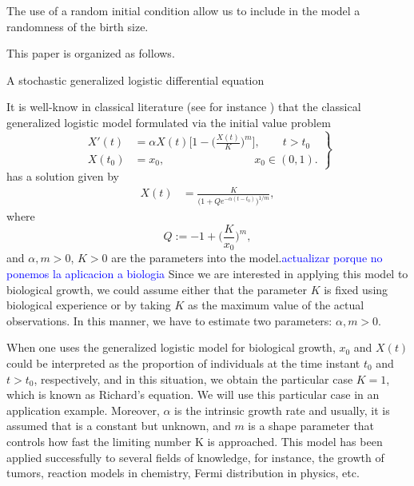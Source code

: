 \documentclass[12pt, reqno]{amsart}
\makeatletter
\def\section{\@startsection{section}{1}%
     \z@{.7\linespacing\@plus\linespacing}{.5\linespacing}%
     {\bfseries
     \centering
     }}
\newcommand{\fer}[1]{{\textcolor{blue}{#1}}}
\newcommand{\1}{{\bf 1}}
\newcommand{\2}{{\bf 2}}
\theoremstyle{definition}
\theoremstyle{remark}
\numberwithin{equation}{section}
\makeatother
\begin{document}
	The use of a random initial condition  allow us to include in the model a 
randomness of the  birth size.

This paper is organized as follows.

\section{A stochastic generalized logistic differential equation}
	\label{sec-SGLDE}

	It is well-know in classical literature (see for instance \cite{br-go}) that the classical generalized logistic model formulated via the initial value problem 
\begin{equation}\label{det-GLDE}
  \left.
  \begin{aligned} 
  	X'(t) &= 
  		\alpha X(t)
  			\Bigg[
  				1 - 
  				\Bigg(
  					\frac{X(t)}{K}
  					\Bigg )^m\Bigg],\qquad t>t_0
  	\\
 		X(t_0) &= 
 			x_0,
 			\qquad\qquad\qquad \qquad
 			x_0\in(0,1).
 \end{aligned}
 \right\}
 \end{equation}
has a solution given by 
\begin{align}
 X(t)&= \frac{K}{\Big(1+ Q  e^{-\alpha(t-t_0)}\Big)^{1/m}},
\end{align}
where
$$
Q:= -1 + \Big(\frac{K}{x_0}\Big)^m,
$$
and $\alpha,m>0$, $K>0$ are the parameters into the model.\fer{actualizar porque no ponemos la aplicacion a biologia} Since we are interested in applying this model to biological growth, we could assume either that the parameter $K$ is fixed using biological experience or by taking $K$ as the maximum value of the actual observations. In this manner, we have to estimate two parameters: $\alpha,m>0$.


When one uses the generalized logistic model for biological growth, $x_0$ and $X(t)$ could be interpreted as the proportion of individuals at the time instant $t_0$ and $t>t_0$, respectively, and in this situation, we obtain the particular case $K=1$, which is known as Richard's equation. We will use this particular case in an application example.  Moreover, $\alpha$ is the  intrinsic growth rate and usually, it is assumed that is a constant but unknown, and $m$ is a shape parameter that controls how fast the limiting number K is approached.  This model has been applied successfully to several fields of knowledge, for instance, the growth of tumors, reaction models in chemistry, Fermi distribution in  physics, etc. 
\end{document}
